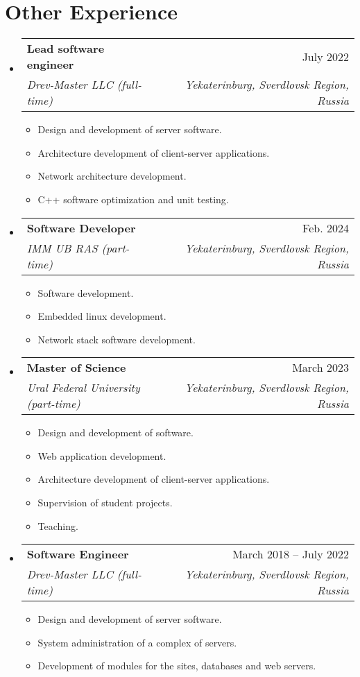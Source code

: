 \documentclass[a4paper,11pt]{article}
\makeatletter
\newcommand{\resumeItem}[1]{
    \item{
                {#1 \vspace{-4pt}}
          }
}
\newcommand{\resumeSubheading}[4]{
    \vspace{-2pt}\item
    \begin{tabular*}{0.97\textwidth}[t]{l@{\extracolsep{\fill}}r}
        \textbf{#1} & #2 \\
        \textit{\small #3} & \textit{\small #4} \\
    \end{tabular*}\vspace{-10pt}
}
\newcommand{\resumeSubHeadingListStart}{\begin{itemize}[leftmargin=0.15in, label={}]}
\newcommand{\resumeSubHeadingListEnd}{\end{itemize}}
\newcommand{\resumeItemListStart}{\begin{itemize}}
\newcommand{\resumeItemListEnd}{\end{itemize}\vspace{-2pt}}
\makeatother
\begin{document}

\section{Other Experience}
\resumeSubHeadingListStart

\resumeSubheading
    {Lead software engineer}{July 2022}
    {Drev-Master LLC (full-time)}{Yekaterinburg, Sverdlovsk Region, Russia}
    \resumeItemListStart
        \small\resumeItem{Design and development of server software.}
        \resumeItem{Architecture development of client-server applications.}
        \resumeItem{Network architecture development.}
        \resumeItem{C++ software optimization and unit testing.}
    \resumeItemListEnd

\resumeSubheading
    {Software Developer}{Feb. 2024}
    {IMM UB RAS (part-time)}{Yekaterinburg, Sverdlovsk Region, Russia}
    \resumeItemListStart
        \small\resumeItem{Software development.}
        \resumeItem{Embedded linux development.}
        \resumeItem{Network stack software development.}
    \resumeItemListEnd

\resumeSubheading
    {Master of Science}{March 2023}
    {Ural Federal University (part-time)}{Yekaterinburg, Sverdlovsk Region, Russia}
    \resumeItemListStart
        \small\resumeItem{Design and development of software.}
        \resumeItem{Web application development.}
        \resumeItem{Architecture development of client-server applications.}
        \resumeItem{Supervision of student projects.}
        \resumeItem{Teaching.}
    \resumeItemListEnd

\resumeSubheading
    {Software Engineer}{March 2018 -- July 2022}
    {Drev-Master LLC (full-time)}{Yekaterinburg, Sverdlovsk Region, Russia}
    \resumeItemListStart
        \small\resumeItem{Design and development of server software.}
        \resumeItem{System administration of a complex of servers.}
        \resumeItem{Development of modules for the sites, databases and web servers.}
    \resumeItemListEnd


\resumeSubHeadingListEnd

\end{document}

